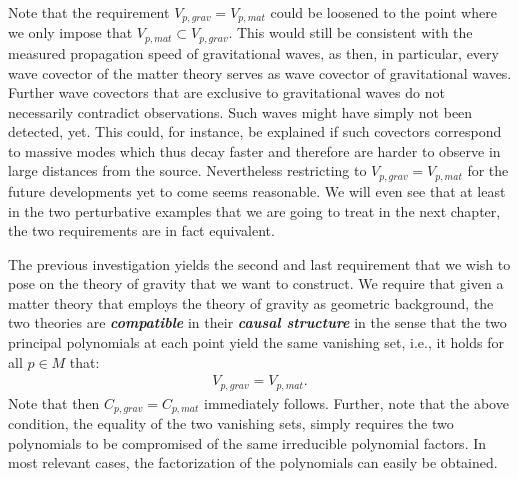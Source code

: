 \begin{remark}
Note that the requirement $V_{p,grav} = V_{p,mat}$ could be loosened to the point where we only impose that $V_{p,mat} \subset V_{p,grav}$. This would still be consistent with the measured propagation speed of gravitational waves, as then, in particular, every wave covector of the matter theory serves as wave covector of gravitational waves. Further wave covectors that are exclusive to gravitational waves do not necessarily contradict observations. Such waves might have simply not been detected, yet. This could, for instance, be explained if such covectors correspond to massive modes which thus decay faster and therefore are harder to observe in large distances from the source. Nevertheless restricting to $V_{p,grav} = V_{p,mat}$ for the future developments yet to come seems reasonable.
We will even see that at least in the two perturbative examples that we are going to treat in the next chapter, the two requirements are in fact equivalent.
\end{remark}
The previous investigation yields the second and last requirement that we wish to pose on the theory of gravity that we want to construct. We require that given a matter theory that employs the theory of gravity as geometric background, the two theories are \textit{\textbf{compatible}} in their \textit{\textbf{causal structure}} in the sense that the two principal polynomials at each point yield the same vanishing set, i.e., it holds for all $p \in M$ that: 
\begin{align}
    V_{p,grav} = V_{p,mat}.
\end{align}
Note that then $C_{p,grav} = C_{p,mat}$ immediately follows. Further, note that the above condition, the equality of the two vanishing sets, simply requires the two polynomials to be compromised of the same irreducible polynomial factors. In most relevant cases, the factorization of the polynomials can easily be obtained.


